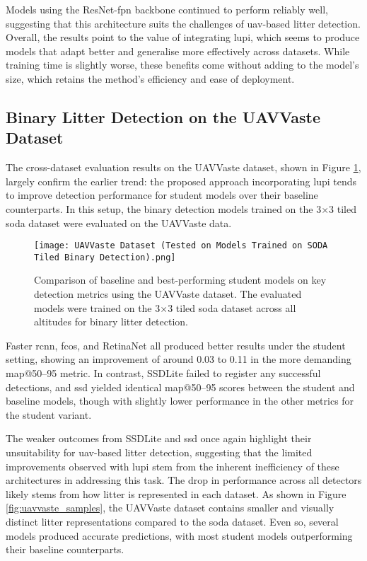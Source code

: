 Models using the ResNet-\gls{fpn} backbone continued to perform reliably well, suggesting that this architecture suits the challenges of \gls{uav}-based litter detection. Overall, the results point to the value of integrating \gls{lupi}, which seems to produce models that adapt better and generalise more effectively across datasets. While training time is slightly worse, these benefits come without adding to the model’s size, which retains the method's efficiency and ease of deployment.


\subsection{Binary Litter Detection on the UAVVaste Dataset}
\label{subsec:5_uavvaste_exp}

The cross-dataset evaluation results on the UAVVaste dataset, shown in Figure \ref{fig:uavvaste_bar}, largely confirm the earlier trend: the proposed approach incorporating \gls{lupi} tends to improve detection performance for student models over their baseline counterparts. In this setup, the binary detection models trained on the 3$\times$3 tiled \gls{soda} dataset were evaluated on the UAVVaste data.

\begin{figure}[!ht]
    \centering
    \texttt{[image: UAVVaste Dataset (Tested on Models Trained on SODA Tiled Binary Detection).png]}
    \caption{Comparison of baseline and best-performing student models on key detection metrics using the UAVVaste dataset. The evaluated models were trained on the 3$\times$3 tiled \gls{soda} dataset across all altitudes for binary litter detection.}
    \label{fig:uavvaste_bar}
\end{figure}

Faster \gls{rcnn}, \gls{fcos}, and RetinaNet all produced better results under the student setting, showing an improvement of around 0.03 to 0.11 in the more demanding \gls{map}@50--95 metric. In contrast, SSDLite failed to register any successful detections, and \gls{ssd} yielded identical \gls{map}@50--95 scores between the student and baseline models, though with slightly lower performance in the other metrics for the student variant.

The weaker outcomes from SSDLite and \gls{ssd} once again highlight their unsuitability for \gls{uav}-based litter detection, suggesting that the limited improvements observed with \gls{lupi} stem from the inherent inefficiency of these architectures in addressing this task.
The drop in performance across all detectors likely stems from how litter is represented in each dataset. As shown in Figure \ref{fig:uavvaste_samples}, the UAVVaste dataset contains smaller and visually distinct litter representations compared to the \gls{soda} dataset. Even so, several models produced accurate predictions, with most student models outperforming their baseline counterparts.

